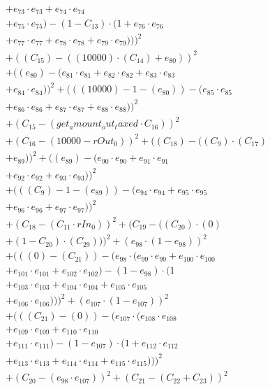 \documentclass[10pt, a4paper]{article}
\begin{document}
\begin{small}
\begin{align*}
& + e_{73} \cdot e_{73} + e_{74} \cdot e_{74} \\
& + e_{75} \cdot e_{75}) - (1 - C_{13}) \cdot (1 + e_{76} \cdot e_{76} \\
& + e_{77} \cdot e_{77} + e_{78} \cdot e_{78} + e_{79} \cdot e_{79})))^{2} \\
& + ((C_{15}) - ((10000)  \cdot  (C_{14}) + e_{80}))^{2} \\
& + ((e_{80}) - (e_{81} \cdot e_{81} + e_{82} \cdot e_{82} + e_{83} \cdot e_{83} \\
& + e_{84} \cdot e_{84}))^{2} + (((10000) - 1 - (e_{80})) - (e_{85} \cdot e_{85} \\
& + e_{86} \cdot e_{86} + e_{87} \cdot e_{87} + e_{88} \cdot e_{88}))^{2} \\
& + (C_{15} - (get_amount_out_taxed  \cdot  C_{16}))^{2} \\
& + (C_{16} - (10000 - rOut_0))^{2} + ((C_{18}) - ((C_{9})  \cdot  (C_{17}) \\
& + e_{89}))^{2} + ((e_{89}) - (e_{90} \cdot e_{90} + e_{91} \cdot e_{91} \\
& + e_{92} \cdot e_{92} + e_{93} \cdot e_{93}))^{2} \\
& + (((C_{9}) - 1 - (e_{89})) - (e_{94} \cdot e_{94} + e_{95} \cdot e_{95} \\
& + e_{96} \cdot e_{96} + e_{97} \cdot e_{97}))^{2} \\
& + (C_{18} - (C_{11}  \cdot  rIn_0))^{2} + (C_{19} - ((C_{20})  \cdot  (0) \\
& + (1 - C_{20})  \cdot  (C_{29})))^{2} + (e_{98} \cdot (1 - e_{98}))^{2} \\
& + (((0) - (C_{21})) - (e_{98} \cdot (e_{99} \cdot e_{99} + e_{100} \cdot e_{100} \\
& + e_{101} \cdot e_{101} + e_{102} \cdot e_{102}) - (1 - e_{98}) \cdot (1 \\
& + e_{103} \cdot e_{103} + e_{104} \cdot e_{104} + e_{105} \cdot e_{105} \\
& + e_{106} \cdot e_{106})))^{2} + (e_{107} \cdot (1 - e_{107}))^{2} \\
& + (((C_{21}) - (0)) - (e_{107} \cdot (e_{108} \cdot e_{108} \\
& + e_{109} \cdot e_{109} + e_{110} \cdot e_{110} \\
& + e_{111} \cdot e_{111}) - (1 - e_{107}) \cdot (1 + e_{112} \cdot e_{112} \\
& + e_{113} \cdot e_{113} + e_{114} \cdot e_{114} + e_{115} \cdot e_{115})))^{2} \\
& + (C_{20} - (e_{98} \cdot e_{107}))^{2} + (C_{21} - (C_{22} + C_{23}))^{2} \\

\end{align*}
\end{small}
\end{document}
